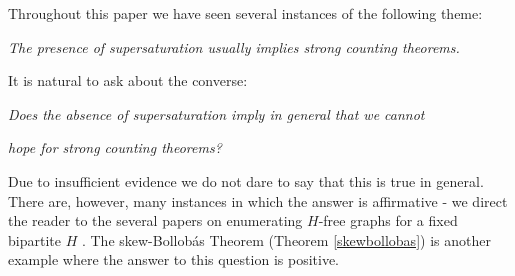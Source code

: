\documentclass[11pt]{article}
\newcommand*{\mybox}[2]{\colorbox{#1!30}{\parbox{.98\linewidth}{#2}}}
\numberwithin{equation}{section}
\begin{document}
\medskip


Throughout this paper we have seen several instances of the following theme:

\vspace{.1in}
\noindent\mybox{gray}{
\vspace{.2in}
\centerline{\emph{The presence of supersaturation usually implies strong counting theorems.}}
\vspace{.2in}
}
\vspace{.1in}

It is natural to ask about the converse:

\vspace{.1in}
\noindent\mybox{gray}{
\vspace{.2in}
\centerline{\emph{Does the absence of supersaturation imply in general that we cannot}}
\centerline{\emph{hope for strong counting theorems?}}
\vspace{.2in}
}
\vspace{.1in}


Due to insufficient evidence we do not dare to say that this is true in general. There are, however, many instances in which the answer is affirmative - we direct the reader to the several papers on enumerating $H$-free graphs for a fixed bipartite $H$ \cite{bs2,kw2,morrissaxtoncycle}. The skew-Bollob\'{a}s Theorem (Theorem \ref{skewbollobas}) is another example where the answer to this question is positive. 
\end{document}
